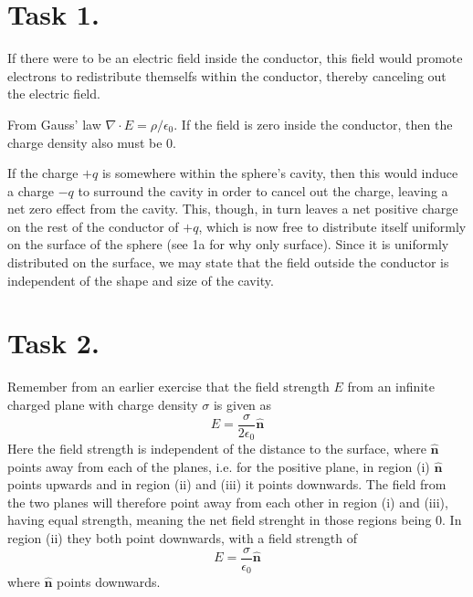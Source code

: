 \documentclass[a4paper,11pt]{article}
\begin{document}


\section*{Task 1.}
\begin{alphalist}
    \item If there were to be an electric field inside the conductor, this field would promote electrons to redistribute themselfs
        within the conductor, thereby canceling out the electric field.
    \item From Gauss' law $\nabla \cdot E = \rho/\epsilon_0$. If the field is zero inside the conductor, then the charge density also must be 0.
    \item If the charge $+q$ is somewhere within the sphere's cavity, then this would induce 
        a charge $-q$ to surround the cavity in order to cancel out the charge, leaving a net zero effect from the cavity. This, though, in turn leaves 
        a net positive charge on the rest of the conductor of $+q$, which is now free to distribute itself uniformly on the surface of the sphere (see 1a for why only surface).
        Since it is uniformly distributed on the surface, we may state that the field outside the conductor is independent of the shape and size of the cavity.
\end{alphalist}

\section*{Task 2.}
Remember from an earlier exercise that the field strength $E$ from an infinite charged plane with charge density $\sigma$ is given as
\[
    E = \frac{\sigma}{2\epsilon_0}\mathbf{\hat{n}}
\]
Here the field strength is independent of the distance to the surface, where $\mathbf{\hat{n}}$ points away from each of the planes, i.e.
for the positive plane, in region (i) $\mathbf{\hat{n}}$ points upwards and in region (ii) and (iii) it points downwards.
The field from the two planes will therefore point away from each other in region (i) and (iii), having equal strength, meaning the net 
field strenght in those regions being 0. In region (ii) they both point downwards, with a field strength of
\[
    E = \frac{\sigma}{\epsilon_0}\mathbf{\hat{n}}
\]
where $\mathbf{\hat{n}}$ points downwards.
\end{document}
